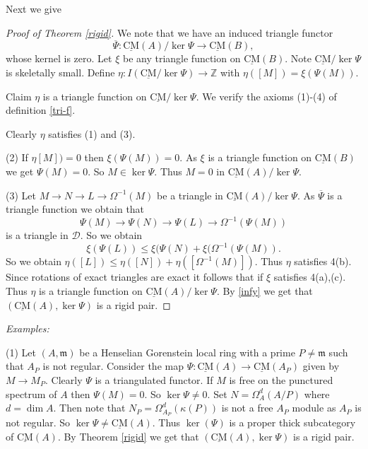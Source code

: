 \documentclass{amsart}
\newcommand{\D}{\mathcal{D} }
\newcommand{\m}{\mathfrak{m} }
\newcommand{\Z}{\mathbb{Z} }
\newcommand{\rt}{\rightarrow}
\newcommand{\ov}{\overline}
\newcommand{\Om}{\Omega}
\newcommand{\CMS}{\operatorname{\underline{CM}}}
\theoremstyle{plain}
\theoremstyle{definition}
\theoremstyle{remark}
\begin{document}
{Next we give
\begin{proof}[Proof of Theorem \ref{rigid}]
We note that we have an induced triangle functor $$\ov{\Psi} \colon \CMS(A)/\ker \Psi \rt \CMS(B),$$ whose kernel is zero. Let $\xi$ be any triangle function on $\CMS(B)$. Note $\CMS/\ker \Psi$ is skeletally small. Define $\eta \colon I(\CMS/\ker \Psi) \rt \Z$ with
$\eta([M]) = \xi(\Psi(M))$.

Claim $\eta$ is a triangle function on $\CMS/\ker \Psi$. We verify the axioms (1)-(4) of
definition \ref{tri-f}.

Clearly $\eta$ satisfies (1) and (3).

(2) If $\eta[M]) = 0$ then $\xi(\Psi(M)) = 0$. As $\xi$ is a triangle function on $\CMS(B)$ we get $\Psi(M) = 0$. So $M \in \ker \Psi$. Thus $M = 0$ in $\CMS(A)/\ker \Psi $.

(3) Let $M \rt N \rt L \rt \Omega^{-1}(M)$ be a triangle in $\CMS(A)/\ker \Psi $. As $\ov{\Psi}$ is a triangle function we obtain that
$$\Psi(M) \rt \Psi(N) \rt \Psi(L) \rt \Omega^{-1}(\Psi(M))$$
is a triangle in $\D$. So we obtain
$$\xi(\Psi(L)) \leq \xi(\Psi(N) + \xi(\Omega^{-1}(\Psi(M)).$$
So we obtain
$\eta([L]) \leq \eta([N]) + \eta([\Om^{-1}(M)])$.
Thus $\eta$ satisfies 4(b).
Since rotations of exact triangles are exact it follows that if $\xi$ satisfies 4(a),(c).
Thus $\eta$ is a triangle function on $\CMS(A)/\ker \Psi$.
By \ref{infy} we get that $(\CMS(A),\ker \Psi)$  is a rigid pair.
\end{proof}

\s \emph{Examples:}

(1) Let $(A, \m)$ be a Henselian Gorenstein local ring with a prime $P \neq \m$ such that $A_P$ is  not regular.
Consider the map $\Psi \colon \CMS(A) \rt \CMS(A_P)$ given by $M \rt M_P$. Clearly $\Psi$ is a triangulated functor. If $M$ is free on the punctured spectrum of $A$ then $\Psi(M) = 0$. So $\ker \Psi \neq 0$. Set $N = \Omega^d_A(A/P)$ where $d  = \dim A$. Then note that
$N_P = \Omega^d_{A_P}(\kappa(P))$ is not a free $A_P$ module as $A_P$ is not regular. So $\ker \Psi \neq \CMS(A)$.
Thus $\ker(\Psi)$ is a proper thick subcategory of $\CMS(A)$. By Theorem \ref{rigid} we get that $(\CMS(A), \ker\Psi)$ is a rigid pair.

}
\end{document}
